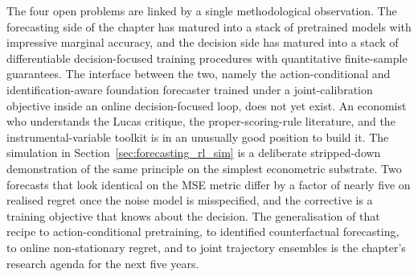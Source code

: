 The four open problems are linked by a single methodological observation.
The forecasting side of the chapter has matured into a stack of pretrained
models with impressive marginal accuracy, and the decision side has matured
into a stack of differentiable decision-focused training procedures with
quantitative finite-sample guarantees. The interface between the two, namely
the action-conditional and identification-aware foundation forecaster
trained under a joint-calibration objective inside an online decision-focused
loop, does not yet exist. An economist who understands the Lucas critique,
the proper-scoring-rule literature, and the instrumental-variable toolkit is
in an unusually good position to build it. The simulation in
Section~\ref{sec:forecasting_rl_sim} is a deliberate stripped-down
demonstration of the same principle on the simplest econometric substrate.
Two forecasts that look identical on the MSE metric differ by a factor of
nearly five on realised regret once the noise model is misspecified, and
the corrective is a training objective that knows about the decision. The
generalisation of that recipe to action-conditional pretraining, to
identified counterfactual forecasting, to online non-stationary regret, and
to joint trajectory ensembles is the chapter's research agenda for the next
five years.
